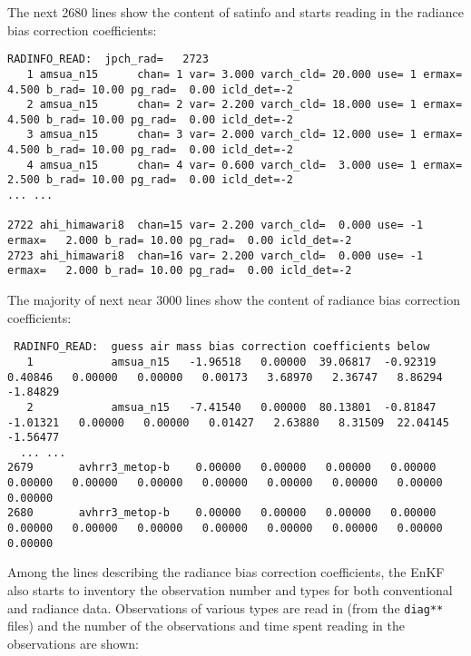 The next 2680 lines show the content of satinfo and starts reading in the radiance bias correction coefficients:
\begin{scriptsize}
\begin{verbatim}
RADINFO_READ:  jpch_rad=   2723
   1 amsua_n15      chan= 1 var= 3.000 varch_cld= 20.000 use= 1 ermax=   4.500 b_rad= 10.00 pg_rad=  0.00 icld_det=-2
   2 amsua_n15      chan= 2 var= 2.200 varch_cld= 18.000 use= 1 ermax=   4.500 b_rad= 10.00 pg_rad=  0.00 icld_det=-2
   3 amsua_n15      chan= 3 var= 2.000 varch_cld= 12.000 use= 1 ermax=   4.500 b_rad= 10.00 pg_rad=  0.00 icld_det=-2
   4 amsua_n15      chan= 4 var= 0.600 varch_cld=  3.000 use= 1 ermax=   2.500 b_rad= 10.00 pg_rad=  0.00 icld_det=-2
... ...

2722 ahi_himawari8  chan=15 var= 2.200 varch_cld=  0.000 use= -1 ermax=   2.000 b_rad= 10.00 pg_rad=  0.00 icld_det=-2
2723 ahi_himawari8  chan=16 var= 2.200 varch_cld=  0.000 use= -1 ermax=   2.000 b_rad= 10.00 pg_rad=  0.00 icld_det=-2
\end{verbatim}
\end{scriptsize}

The majority of next near 3000 lines show the content of radiance bias correction coefficients:
\begin{tiny}
\begin{verbatim}
 RADINFO_READ:  guess air mass bias correction coefficients below
   1            amsua_n15   -1.96518   0.00000  39.06817  -0.92319   0.40846   0.00000   0.00000   0.00173   3.68970   2.36747   8.86294  -1.84829
   2            amsua_n15   -7.41540   0.00000  80.13801  -0.81847  -1.01321   0.00000   0.00000   0.01427   2.63880   8.31509  22.04145  -1.56477
  ... ...
2679       avhrr3_metop-b    0.00000   0.00000   0.00000   0.00000   0.00000   0.00000   0.00000   0.00000   0.00000   0.00000   0.00000   0.00000
2680       avhrr3_metop-b    0.00000   0.00000   0.00000   0.00000   0.00000   0.00000   0.00000   0.00000   0.00000   0.00000   0.00000   0.00000
\end{verbatim}
\end{tiny}

Among the lines describing the radiance bias correction coefficients, the EnKF also starts to inventory the observation number and types for both conventional and radiance data. Observations of various types are read in (from the \verb|diag**| files) and the number of the observations and time spent reading in the observations are shown:

